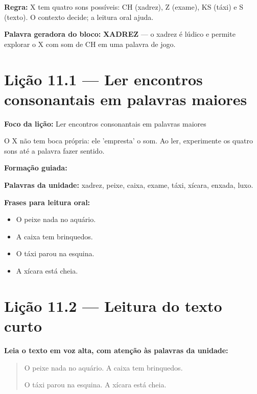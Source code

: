 \textbf{Regra:} X tem quatro sons possíveis: CH (xadrez), Z (exame), KS (táxi) e S (texto). O contexto decide; a leitura oral ajuda.

\textbf{Palavra geradora do bloco:} \textbf{XADREZ} --- o xadrez é lúdico e permite explorar o X com som de CH em uma palavra de jogo.

\section{Lição 11.1 --- Ler encontros consonantais em palavras maiores}

\textbf{Foco da lição:} Ler encontros consonantais em palavras maiores


\begin{boquinha}
O X não tem boca própria: ele 'empresta' o som. Ao ler, experimente os quatro sons até a palavra fazer sentido.
\end{boquinha}

\noindent\textbf{Formação guiada:}

\begin{center}
\end{center}

\noindent\textbf{Palavras da unidade:} xadrez, peixe, caixa, exame, táxi, xícara, enxada, luxo.

\noindent\textbf{Frases para leitura oral:}
\begin{itemize}[leftmargin=1.6em]
  \item O peixe nada no aquário.
  \item A caixa tem brinquedos.
  \item O táxi parou na esquina.
  \item A xícara está cheia.
\end{itemize}

\section{Lição 11.2 --- Leitura do texto curto}

\noindent\textbf{Leia o texto em voz alta, com atenção às palavras da unidade:}


\begin{quote}
O peixe nada no aquário. A caixa tem brinquedos.

O táxi parou na esquina. A xícara está cheia.
\end{quote}

